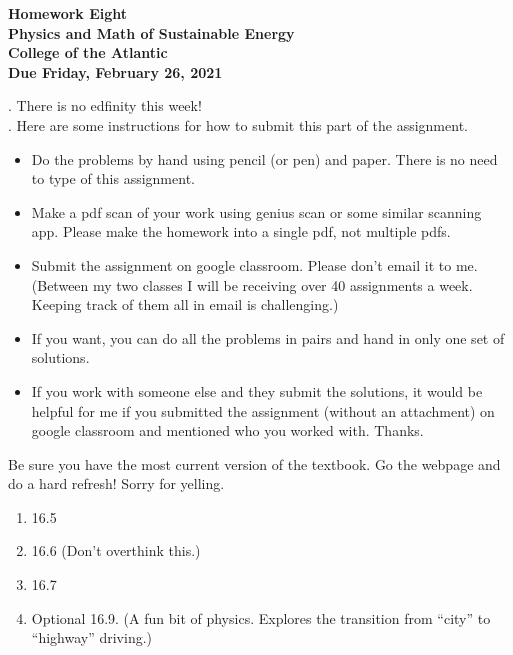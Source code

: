\documentclass[12pt]{article}
\begin{document}
\pagestyle{empty}
 
\begin{center}
{\LARGE {\bf Homework Eight}}\\
\bigskip
{\Large {\bf Physics and Math of Sustainable Energy}}\\
\bigskip
{\Large {\bf College of the Atlantic}}\\
\bigskip
{ {\bf Due Friday, February 26, 2021}}\\ 
\end{center}
\medskip



.  There is no edfinity this week!\\


.
Here are some 
instructions for how to submit this part of the assignment.
\begin{itemize}
\setlength{\itemsep}{0mm}
\item Do the problems by hand using pencil (or pen) and paper.
  There is no need to type of this assignment.
\item Make a pdf scan of your work using genius scan or some
  similar scanning app.  Please make the homework into a single
  pdf, not multiple pdfs. 
\item Submit the assignment on google classroom.  Please don't
  email it to me.  (Between my two classes I will be receiving
  over 40 assignments a week.  Keeping track of them all in email
  is challenging.)
\item If you want, you can do all the problems in pairs and hand
  in only one set of solutions.
\item If you work with someone else and they submit the solutions, it
  would be helpful for me if you submitted the assignment (without an
  attachment) on google classroom and mentioned who you worked with.
  Thanks. 

\end{itemize}


  Be sure you have the most
current version of the textbook.  Go the webpage and do a hard
refresh!  Sorry for yelling.\\ 


\begin{enumerate}
\setlength{\itemsep}{-1mm}
\item 16.5
\item 16.6 (Don't overthink this.)
\item 16.7
\item Optional 16.9.  (A fun bit of physics.  Explores the transition
  from ``city'' to ``highway'' driving.)
\end{enumerate}
\end{document}
